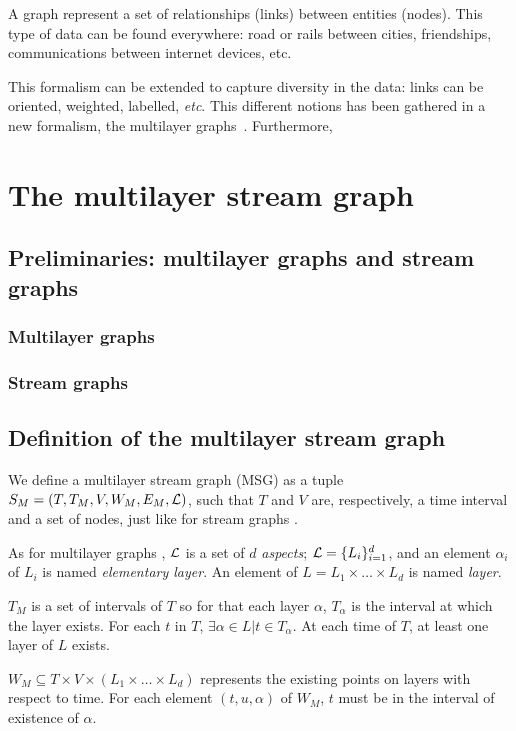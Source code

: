 \documentclass{svproc}
\begin{document}
A graph represent a set of relationships (links) between entities (nodes). This type of data can be found everywhere: road or rails between cities, friendships, communications between internet devices, etc. 

This formalism can be extended to capture diversity in the data: links can be oriented, weighted, labelled, \textit{etc}. This different notions has been gathered in a new formalism, the multilayer graphs~\cite{mlkiv}. Furthermore, 

\section{The multilayer stream graph}
%
\subsection{Preliminaries: multilayer graphs and stream graphs}
%

\subsubsection{Multilayer graphs}

\subsubsection{Stream graphs}
\subsection{Definition of the multilayer stream graph}
%
We define a multilayer stream graph (MSG) as a tuple $S_M = (T,T_M,V,W_M,E_M,{\cal L})$, such that $T$ and $V$ are, respectively, a time interval and a set of nodes, just like for stream graphs \cite{stream}.
    
    As for multilayer graphs \cite{mlkiv}, ${\cal L}$ is a set of $d$ {\em aspects}; ${\cal L} = \{L_i\}_{i=1}^d$, and an element $\alpha_i$ of $L_i$ is named {\em elementary layer}. An element of $L=L_1\times \dots \times L_d$ is named {\em layer}.

	$T_M$ is a set of intervals of $T$ so for that each layer $\alpha$, $T_{\alpha}$ is the interval at which the layer exists. For each $t$ in $T$, $\exists \alpha \in L | t \in T_{\alpha}$. At each time of $T$, at least one layer of $L$ exists.

	$W_M \subseteq T\times V \times (L_1 \times \dots \times L_d)$ represents the existing points on layers with respect to time. For each element $(t,u,\alpha)$ of $W_M$, $t$ must be in the interval of existence of $\alpha$.
\end{document}
